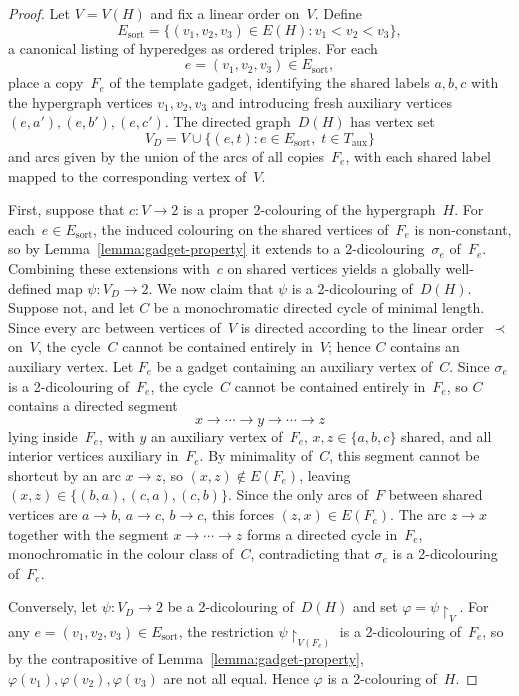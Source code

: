 \begin{proof}
	Let $V = V(H)$ and fix a linear order on~$V$.
	Define $$E_{\mathrm{sort}} = \bigl\{(v_1,v_2,v_3)\in E(H) : v_1 < v_2 < v_3\bigr\},$$
	a canonical listing of hyperedges as ordered triples.
	For each $$e=(v_1,v_2,v_3)\in E_{\mathrm{sort}},$$ place a copy~$F_e$ of the template gadget, identifying the shared labels $a,b,c$ with the hypergraph vertices $v_1,v_2,v_3$ and introducing fresh auxiliary vertices $(e,a'),(e,b'),(e,c')$.
	The directed graph~$D(H)$ has vertex set $$V_D = V \cup \bigl\{(e,t) : e\in E_{\mathrm{sort}},\; t\in T_{\mathrm{aux}}\bigr\}$$
	and arcs given by the union of the arcs of all copies~$F_e$, with each shared label mapped to the corresponding vertex of~$V$.

	First, suppose that $c\colon V\to 2$ is a proper 2-colouring of the hypergraph~$H$.
	For each~$e\in E_{\mathrm{sort}}$, the induced colouring on the shared vertices of~$F_e$ is non-constant, so by Lemma~\ref{lemma:gadget-property} it extends to a 2-dicolouring~$\sigma_e$ of~$F_e$.
	Combining these extensions with~$c$ on shared vertices yields a globally well-defined map $\psi\colon V_D\to 2$.
	We now claim that $\psi$ is a 2-dicolouring of~$D(H)$.
	Suppose not, and let $C$ be a monochromatic directed cycle of minimal length.
	Since every arc between vertices of~$V$ is directed according to the linear order~$\prec$ on~$V$, the cycle~$C$ cannot be contained entirely in~$V$; hence $C$ contains an auxiliary vertex.
	Let $F_e$ be a gadget containing an auxiliary vertex of~$C$.
	Since $\sigma_e$ is a 2-dicolouring of~$F_e$, the cycle~$C$ cannot be contained entirely in~$F_e$, so $C$ contains a directed segment $$x\to\cdots\to y\to\cdots\to z$$ lying inside~$F_e$, with $y$ an auxiliary vertex of~$F_e$, $x,z\in\{a,b,c\}$ shared, and all interior vertices auxiliary in~$F_e$.
	By minimality of~$C$, this segment cannot be shortcut by an arc $x\to z$, so $(x,z)\notin E(F_e)$, leaving $(x,z)\in\{(b,a),(c,a),(c,b)\}$.
	Since the only arcs of~$F$ between shared vertices are $a\to b$, $a\to c$, $b\to c$, this forces $(z,x)\in E(F_e)$.
	The arc $z\to x$ together with the segment $x\to\cdots\to z$ forms a directed cycle in~$F_e$, monochromatic in the colour class of~$C$, contradicting that $\sigma_e$ is a 2-dicolouring of~$F_e$.

	Conversely, let $\psi\colon V_D\to 2$ be a 2-dicolouring of~$D(H)$ and set $\varphi = \psi\restriction_V$.
	For any $e = (v_1,v_2,v_3)\in E_{\mathrm{sort}}$, the restriction $\psi\restriction_{V(F_e)}$ is a 2-dicolouring of~$F_e$, so by the contrapositive of Lemma~\ref{lemma:gadget-property}, $\varphi(v_1),\varphi(v_2),\varphi(v_3)$ are not all equal.
	Hence $\varphi$ is a 2-colouring of~$H$.
\end{proof}

